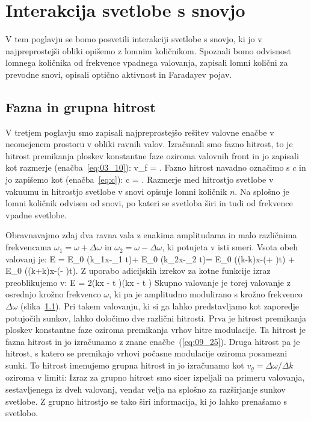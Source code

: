 
\chapter{Interakcija svetlobe s snovjo}
V tem poglavju se bomo posvetili interakciji svetlobe s snovjo, ki jo 
v najpreprostejši obliki opišemo z lomnim količnikom. Spoznali bomo 
odvisnost lomnega količnika od frekvence vpadnega valovanja, zapisali
lomni količni za prevodne snovi, opisali optično aktivnost in Faradayev 
pojav.

\section{Fazna in grupna hitrost}
V tretjem poglavju smo zapisali najpreprostejšo rešitev valovne enačbe
v neomejenem prostoru v obliki ravnih valov. Izračunali smo fazno hitrost,
to je hitrost premikanja ploskev konstantne faze oziroma valovnih front in
jo zapisali kot razmerje (enačba~\ref{eq:03_10}):
\beq
v_f = .
\label{eq:09_25}
\eeq
Fazno hitrost navadno označimo s $c$ in jo zapišemo kot (enačba~\ref{eq:c}):
\beq
c = .
\label{eq:09_01}
\eeq
Razmerje med hitrostjo svetlobe v vakuumu in hitrostjo svetlobe v snovi
opisuje lomni količnik $n$. Na splošno je lomni količnik odvisen 
od snovi, po kateri se svetloba širi in tudi od frekvence vpadne svetlobe.

Obravnavajmo zdaj dva ravna vala z enakima amplitudama in malo različnima 
frekvencama $\omega_1=\omega + \Delta \omega$ in $\omega_2=\omega - \Delta \omega$, 
ki potujeta v isti smeri. Vsota obeh valovanj je:
\beq
E = E_0 \cos (k_1x-\omega_1 t)+ E_0 \cos (k_2x-\omega_2 t)=
E_0 \cos\left((k-\Delta k)x-(\omega + \Delta \omega)t\right) 
+ E_0 \cos\left((k+\Delta k)x-(\omega - \Delta \omega)t\right). 
\label{eq:09_23}
\eeq
Z uporabo adicijskih izrekov za kotne funkcije izraz preoblikujemo v:
\beq
E = 2\cos \left(kx - \omega t \right)\cos \left(\Delta kx - \Delta \omega t \right) 
\label{eq:09_24}
\eeq
Skupno valovanje je torej valovanje z osrednjo krožno frekvenco $\omega$, 
ki pa je amplitudno modulirano s krožno frekvenco $\Delta \omega$ (slika~\ref{}).
Pri takem valovanju, ki si ga lahko predstavljamo kot zaporedje potujočih sunkov,
lahko določimo dve različni hitrosti. Prva je hitrost premikanja ploskev konstantne
faze oziroma premikanja vrhov hitre modulacije. Ta hitrost je fazna hitrost in
jo izračunamo z znane enačbe~(\ref{eq:09_25}). Druga hitrost pa je hitrost, s katero
se premikajo vrhovi počasne modulacije oziroma posamezni sunki. To hitrost imenujemo
grupna hitrost in jo izračunamo kot $v_g=\Delta \omega/\Delta k$ oziroma v limiti:
Izraz za grupno hitrost smo sicer izpeljali na primeru valovanja, sestavljenega iz dveh
valovanj, vendar velja na splošno za razširjanje sunkov svetlobe. Z grupno hitrostjo
se tako širi informacija, ki jo lahko prenašamo s svetlobo.

